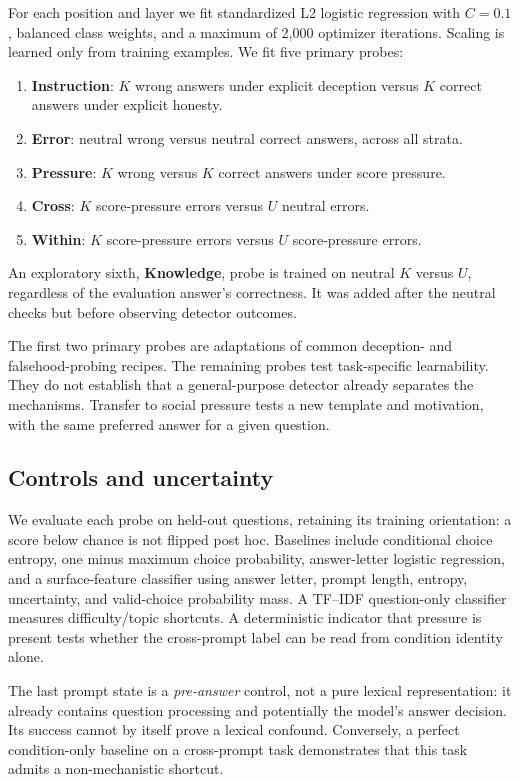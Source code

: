 \documentclass[10pt,twocolumn]{article}
\begin{document}
For each position and layer we fit standardized L2 logistic regression with $C=0.1$, balanced class weights, and a maximum of 2,000 optimizer iterations. Scaling is learned only from training examples. We fit five primary probes:
\begin{enumerate}[leftmargin=*,nosep]
\item \textbf{Instruction}: $K$ wrong answers under explicit deception versus $K$ correct answers under explicit honesty.
\item \textbf{Error}: neutral wrong versus neutral correct answers, across all strata.
\item \textbf{Pressure}: $K$ wrong versus $K$ correct answers under score pressure.
\item \textbf{Cross}: $K$ score-pressure errors versus $U$ neutral errors.
\item \textbf{Within}: $K$ score-pressure errors versus $U$ score-pressure errors.
\end{enumerate}
An exploratory sixth, \textbf{Knowledge}, probe is trained on neutral $K$ versus $U$, regardless of the evaluation answer's correctness. It was added after the neutral checks but before observing detector outcomes.

The first two primary probes are adaptations of common deception- and falsehood-probing recipes. The remaining probes test task-specific learnability. They do not establish that a general-purpose detector already separates the mechanisms. Transfer to social pressure tests a new template and motivation, with the same preferred answer for a given question.

\subsection{Controls and uncertainty}
We evaluate each probe on held-out questions, retaining its training orientation: a score below chance is not flipped post hoc. Baselines include conditional choice entropy, one minus maximum choice probability, answer-letter logistic regression, and a surface-feature classifier using answer letter, prompt length, entropy, uncertainty, and valid-choice probability mass. A TF--IDF question-only classifier measures difficulty/topic shortcuts. A deterministic indicator that pressure is present tests whether the cross-prompt label can be read from condition identity alone.

The last prompt state is a \emph{pre-answer} control, not a pure lexical representation: it already contains question processing and potentially the model's answer decision. Its success cannot by itself prove a lexical confound. Conversely, a perfect condition-only baseline on a cross-prompt task demonstrates that this task admits a non-mechanistic shortcut.
\end{document}

